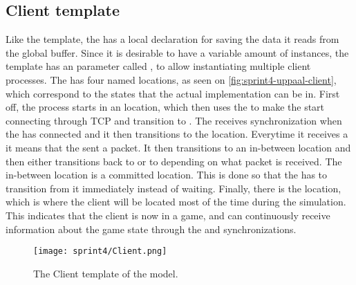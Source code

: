 \subsection*{Client template}
Like the  template, the  has a local declaration for saving the data it reads from the global buffer.
Since it is desirable to have a variable amount of instances, the template has an  parameter called , to allow instantiating multiple client processes.
The  has four named locations, as seen on \autoref{fig:sprint4-uppaal-client}, which correspond to the states that the actual implementation can be in.
First off, the process starts in an  location, which then uses the  to make the  start connecting through TCP and transition to .
The  receives  synchronization when the  has connected and it then transitions to the  location.
Everytime it receives a  it means that the  sent a packet.
It then transitions to an in-between location and then either transitions back to  or to  depending on what packet is received.
The in-between location is a committed location.
This is done so that the  has to transition from it immediately instead of waiting.
Finally, there is the  location, which is where the client will be located most of the time during the simulation.
This indicates that the client is now in a game, and can continuously receive information about the game state through the  and  synchronizations.
\begin{figure}[h]
    \centering
    \texttt{[image: sprint4/Client.png]}
    \caption{The Client template of the \uppaal model.}
    \label{fig:sprint4-uppaal-client}
\end{figure}

